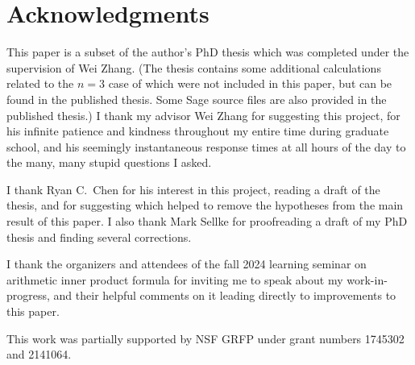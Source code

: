 \section{Acknowledgments}
This paper is a subset of the author's PhD thesis \cite{ref:evans_thesis}
which was completed under the supervision of Wei Zhang.
(The thesis \cite{ref:evans_thesis} contains some additional calculations
related to the $n=3$ case of 
which were not included in this paper, but can be found in the published thesis.
Some Sage source files are also provided in the published thesis.)
I thank my advisor Wei Zhang for suggesting this project,
for his infinite patience and kindness throughout my entire time during graduate school,
and his seemingly instantaneous response times at all hours of the day
to the many, many stupid questions I asked.

I thank Ryan C.~Chen for his interest in this project,
reading a draft of the thesis, and for suggesting \cite{ref:CLZ}
which helped to remove the hypotheses from the main result of this paper.
I also thank Mark Sellke for proofreading a draft of my PhD thesis
and finding several corrections.

I thank the organizers and attendees of the fall 2024
learning seminar on arithmetic inner product formula
for inviting me to speak about my work-in-progress, and their helpful comments on it
leading directly to improvements to this paper.

This work was partially supported by NSF GRFP under grant numbers 1745302 and 2141064.
